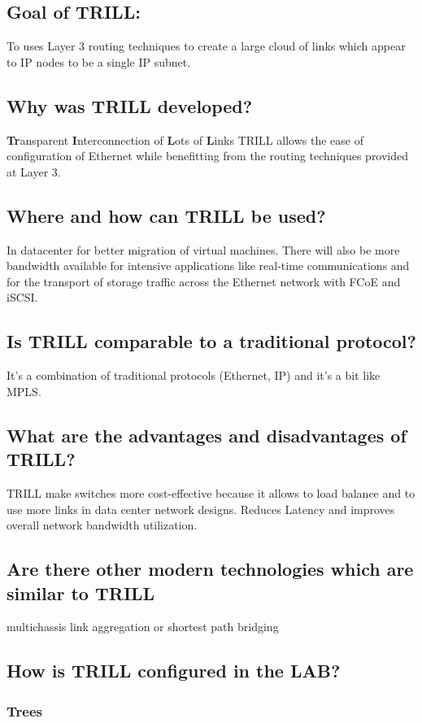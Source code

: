 \documentclass[a4,12pt]{scrartcl}
\begin{document}
\subsection{Goal of TRILL:}
To uses Layer 3 routing techniques to create a large cloud of links which appear to IP nodes to be a single IP subnet. 

\subsection{Why was TRILL developed?}
\textbf{Tr}ansparent \textbf{I}nterconnection of \textbf{L}ots of \textbf{L}inks TRILL allows the ease of configuration of Ethernet while benefitting from the routing techniques provided at Layer 3.

\subsection{Where and how can TRILL be used?}
In datacenter for better migration of virtual machines. There will also be more bandwidth available for intensive applications like real-time communications and for the transport of storage traffic across the Ethernet network with FCoE and iSCSI.

\subsection{Is TRILL comparable to a traditional protocol?}It's a combination of traditional protocols (Ethernet, IP) and it's a bit like MPLS.
\subsection{What are the advantages and disadvantages of TRILL?}
TRILL make switches more cost-effective because it allows to load balance and to use more links in data center network designs.
Reduces Latency and improves overall network bandwidth utilization.
\subsection{Are there other modern technologies which are similar to TRILL} multichassis link aggregation or shortest path bridging
\subsection{How is TRILL configured in the LAB?}
\subsubsection{Trees}
\end{document}
